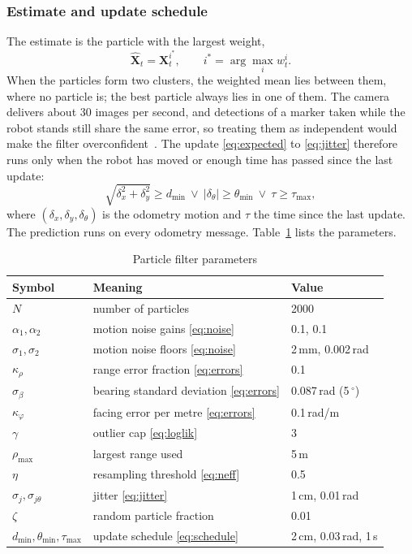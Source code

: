 \documentclass[conference]{IEEEtran}
\newcommand{\vect}[1]{\boldsymbol{#1}}
\begin{document}
\subsubsection{Estimate and update schedule}
The estimate is the particle with the largest weight,
\begin{equation}
\hat{\vect{X}}_t = \vect{X}_t^{i^*}, \qquad i^* = \arg\max_i w_t^i.
\label{eq:estimate}
\end{equation}
When the particles form two clusters, the weighted mean lies between them, where no particle is; the best particle always lies in one of them. The camera delivers about 30 images per second, and detections of a marker taken while the robot stands still share the same error, so treating them as independent would make the filter overconfident~\cite{thrun2005}. The update \eqref{eq:expected} to \eqref{eq:jitter} therefore runs only when the robot has moved or enough time has passed since the last update:
\begin{equation}
\sqrt{\delta_x^2 + \delta_y^2} \geq d_{\min} \ \lor\ |\delta_\theta| \geq \theta_{\min} \ \lor\ \tau \geq \tau_{\max},
\label{eq:schedule}
\end{equation}
where $(\delta_x, \delta_y, \delta_\theta)$ is the odometry motion and $\tau$ the time since the last update. The prediction runs on every odometry message. Table~\ref{tab:params} lists the parameters.

\begin{table}[t]
\centering
\caption{Particle filter parameters}
\label{tab:params}
\begin{tabular}{@{}lll@{}}
\toprule
Symbol & Meaning & Value \\
\midrule
$N$ & number of particles & 2000 \\
$\alpha_1, \alpha_2$ & motion noise gains \eqref{eq:noise} & 0.1, 0.1 \\
$\sigma_1, \sigma_2$ & motion noise floors \eqref{eq:noise} & 2\,mm, 0.002\,rad \\
$\kappa_\rho$ & range error fraction \eqref{eq:errors} & 0.1 \\
$\sigma_\beta$ & bearing standard deviation \eqref{eq:errors} & 0.087\,rad (5\,$^\circ$) \\
$\kappa_\varphi$ & facing error per metre \eqref{eq:errors} & 0.1\,rad/m \\
$\gamma$ & outlier cap \eqref{eq:loglik} & 3 \\
$\rho_{\max}$ & largest range used & 5\,m \\
$\eta$ & resampling threshold \eqref{eq:neff} & 0.5 \\
$\sigma_j, \sigma_{j\theta}$ & jitter \eqref{eq:jitter} & 1\,cm, 0.01\,rad \\
$\zeta$ & random particle fraction & 0.01 \\
$d_{\min}, \theta_{\min}, \tau_{\max}$ & update schedule \eqref{eq:schedule} & 2\,cm, 0.03\,rad, 1\,s \\
\bottomrule
\end{tabular}
\end{table}
\end{document}
